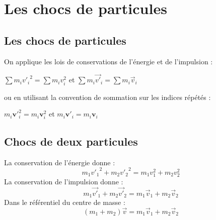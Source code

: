 %
\section{Les chocs de particules}
%
\subsection{Les chocs de particules}
On applique les lois de conservations de l'énergie et de l'impulsion :
\begin{center}
$\sum m_i{v'_i}^2=\sum m_iv_i^2$
\hspace{2cm} et \hspace{2cm}
$\sum m_i\overrightarrow{v'}_i=\sum m_i\overrightarrow{v}_i$
\end{center}
ou en utilisant la convention de sommation sur les indices répétés :
\begin{center}
$m_i\mathbf{v'}_i^2=m_i\mathbf{v}_i^2$
\hspace{2cm} et \hspace{2cm}
$m_i\mathbf{v'}_i=m_i\mathbf{v}_i$
\end{center}
%
\subsection{Chocs de deux particules}
La conservation de l'énergie donne :
\[
m_1{v'_1}^2 + m_2{v'_2}^2=m_1v_1^2 + m_2v_2^2
\]
La conservation de l'impulsion donne :
\[
m_1\overrightarrow{v'}_1 + m_2\overrightarrow{v'}_2=m_1\overrightarrow{v}_1 + m_2\overrightarrow{v}_2
\]
Dans le référentiel du centre de masse : 
\[
(m_1 + m_2)\overrightarrow{v}=m_1\overrightarrow{v}_1 + m_2\overrightarrow{v}_2
\]
%
